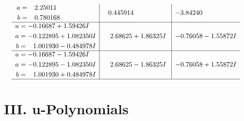 \documentclass[1p]{elsarticle_modified}
\theoremstyle{definition}
\begin{document}
$$\begin{array}{c|c|c}
\begin{aligned}
a &= \phantom{-}2.25011\phantom{ +0.000000I} \\
b &= \phantom{-}0.780168\phantom{ +0.000000I}\end{aligned}
 & \phantom{-}0.445914\phantom{ +0.000000I} & -3.84240\phantom{ +0.000000I} \\ \hline\begin{aligned}
u &= -0.16687 + 1.59426 I \\
a &= -0.122895 + 1.082350 I \\
b &= \phantom{-}1.001930 - 0.484978 I\end{aligned}
 & \phantom{-}2.68625 + 1.86325 I & -0.76058 - 1.55872 I \\ \hline\begin{aligned}
u &= -0.16687 - 1.59426 I \\
a &= -0.122895 - 1.082350 I \\
b &= \phantom{-}1.001930 + 0.484978 I\end{aligned}
 & \phantom{-}2.68625 - 1.86325 I & -0.76058 + 1.55872 I\\
 \hline 
 \end{array}$$\newpage
\newpage\renewcommand{\arraystretch}{1}
\centering \section*{ III. u-Polynomials}
\end{document}
